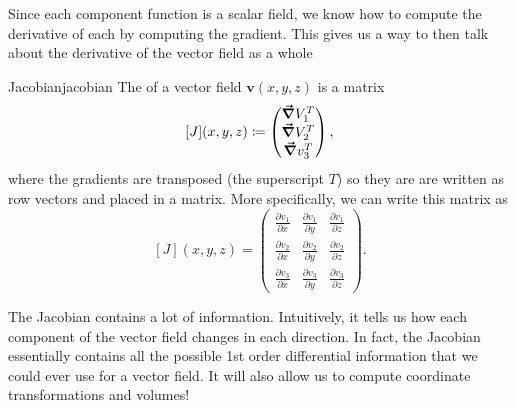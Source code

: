 		        Since each component function is a scalar field, we know how to compute the derivative of each by computing the gradient.  This gives us a way to then talk about the derivative of the vector field as a whole

		        \begin{df}{Jacobian}{jacobian}
		        The  of a vector field $\mathbf{v}(x,y,z)$ is a matrix
		        \[
		        [J](x,y,z)\coloneqq \begin{pmatrix} \boldsymbol{\vec{\nabla}} V_1^T \\ \boldsymbol{\vec{\nabla}} V_2^T \\ \boldsymbol{\vec{\nabla}} v_3^T \end{pmatrix},
		        \]
		        where the gradients are transposed (the superscript $T$) so they are are written as row vectors and placed in a matrix. More specifically, we can write this matrix as
		        \[
		        [J](x,y,z) = \begin{pmatrix} \frac{\partial v_1}{\partial x} & \frac{\partial v_1}{\partial y} & \frac{\partial v_1}{\partial z}\\ \frac{\partial v_2}{\partial x} & \frac{\partial v_2}{\partial y} & \frac{\partial v_2}{\partial z} \\ \frac{\partial v_3}{\partial x} & \frac{\partial v_3}{\partial y} & \frac{\partial v_3}{\partial z} \end{pmatrix}.
		        \]
		        \end{df}

		        The Jacobian contains a lot of information. Intuitively, it tells us how each component of the vector field changes in each direction.  In fact, the Jacobian essentially contains all the possible 1st order differential information that we could ever use for a vector field.  It will also allow us to compute coordinate transformations and volumes!



